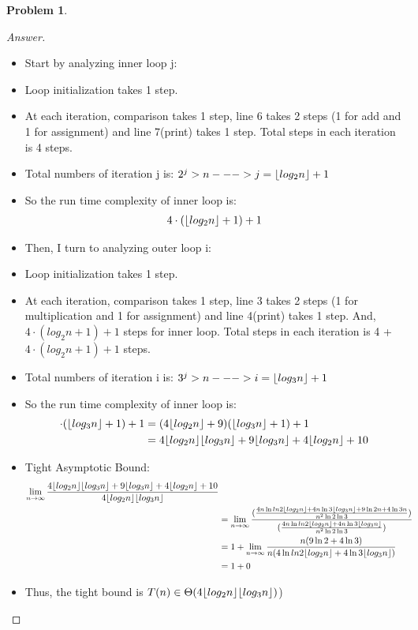 \documentclass[11pt]{article}
\DeclarePairedDelimiter\floor{\lfloor}{\rfloor}
\theoremstyle{definition}
\theoremstyle{definition}
\newtheorem{required}{Problem}
\theoremstyle{definition}
\begin{document}
\begin{required}
\begin{proof}[Answer]
\begin{itemize}
\item Start by analyzing inner loop j:
\item Loop initialization takes 1 step.
\item At each iteration, comparison takes 1 step, line 6 takes 2 steps (1 for add and 1 for assignment) and line 7(print) takes 1 step. Total steps in each iteration is 4 steps.
\item Total numbers of iteration j is: $2^{j}>n ---> j = \floor{log_2 n} +1$
\item So the run time complexity of inner loop is:
\begin{align*}
4\cdot(\floor{log_2 n}+1)+1 
\end{align*}
\item Then, I turn to analyzing outer loop i:
\item Loop initialization takes 1 step.
\item At each iteration, comparison takes 1 step, line 3 takes 2 steps (1 for multiplication  and 1 for assignment) and line 4(print) takes 1 step. And, $4\cdot(log_2 n+1)+1$ steps for inner loop. Total steps in each iteration is 4 + $4\cdot(log_2 n+1)+1$  steps. 
\item Total numbers of iteration i is: $3^{j}>n ---> i = \floor{log_3 n} +1$
\item So the run time complexity of inner loop is:
\begin{align*}
[(4\cdot(\floor{og_2 n}+1)+1)+4]\cdot(\floor{log_3 n} +1) +1 &= (4\floor{log_2 n}+9)(\floor{log_3 n} +1) + 1\\
&= 4 \floor{log_2 n}\floor{log_3 n}+9\floor{log_3 n}+4\floor{log_2 n}+10\\
\end{align*}
\item Tight Asymptotic Bound:
\begin{align*}
\lim_{n \to \infty} \frac{4 \floor{log_2 n}\floor{log_3 n}+9\floor{log_3 n}+4\floor{log_2 n}+10}{4 \floor{log_2 n}\floor{log_3 n}}\\
&= \lim_{n \to \infty} \frac{(\frac{4n\ln{ln2} \floor{log_2 n}+4n\ln{3}\floor{log_3 n}+9\ln{2}n+4\ln{3}n}{n^2 \ln{2}\ln{3}})} {(\frac{{4n\ln{ln2} \floor{log_2 n}+4n\ln{3}\floor{log_3 n}}}{n^2 \ln{2}\ln{3}})}\\
&= 1 + \lim_{n \to \infty} \frac{n(9\ln{2}+4\ln{3})}{n(4\ln{ln2} \floor{log_2 n}+4\ln{3}\floor{log_3 n}) }\\
&= 1 +0
\end{align*}
\item Thus, the tight bound is $T(n) \in \Theta(4 \floor{log_2 n}\floor{log_3 n})$)
\end{itemize}

\end{proof}
\end{required}
\end{document}
